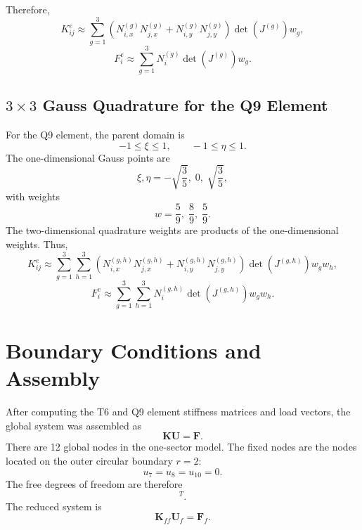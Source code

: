 \documentclass[12pt,a4paper]{article}
\begin{document}
Therefore,
\begin{equation}
    K^e_{ij}\approx \sum_{g=1}^{3}\left(N^{(g)}_{i,x}N^{(g)}_{j,x}+N^{(g)}_{i,y}N^{(g)}_{j,y}\right)\det(J^{(g)})w_g,
\end{equation}
\begin{equation}
    F^e_i\approx \sum_{g=1}^{3}N_i^{(g)}\det(J^{(g)})w_g.
\end{equation}

\subsection{\texorpdfstring{$3\times3$}{3x3} Gauss Quadrature for the Q9 Element}

For the Q9 element, the parent domain is
\begin{equation}
    -1\leq \xi \leq 1, \qquad -1\leq \eta \leq 1.
\end{equation}
The one-dimensional Gauss points are
\begin{equation}
    \xi,\eta = -\sqrt{\frac{3}{5}},\;0,\;\sqrt{\frac{3}{5}},
\end{equation}
with weights
\begin{equation}
    w=\frac{5}{9},\;\frac{8}{9},\;\frac{5}{9}.
\end{equation}
The two-dimensional quadrature weights are products of the one-dimensional weights. Thus,
\begin{equation}
    K^e_{ij}\approx \sum_{g=1}^{3}\sum_{h=1}^{3}\left(N^{(g,h)}_{i,x}N^{(g,h)}_{j,x}+N^{(g,h)}_{i,y}N^{(g,h)}_{j,y}\right)\det(J^{(g,h)})w_gw_h,
\end{equation}
\begin{equation}
    F^e_i\approx \sum_{g=1}^{3}\sum_{h=1}^{3}N_i^{(g,h)}\det(J^{(g,h)})w_gw_h.
\end{equation}

\section{Boundary Conditions and Assembly}

After computing the T6 and Q9 element stiffness matrices and load vectors, the global system was assembled as
\begin{equation}
    \bm{K}\bm{U}=\bm{F}.
\end{equation}
There are 12 global nodes in the one-sector model. The fixed nodes are the nodes located on the outer circular boundary $r=2$:
\begin{equation}
    u_7=u_8=u_{10}=0.
\end{equation}
The free degrees of freedom are therefore
\begin{equation}
    [u_1,u_2,u_3,u_4,u_5,u_6,u_9,u_{11},u_{12}]^T.
\end{equation}
The reduced system is
\begin{equation}
    \bm{K}_{ff}\bm{U}_f=\bm{F}_f.
\end{equation}
\end{document}
